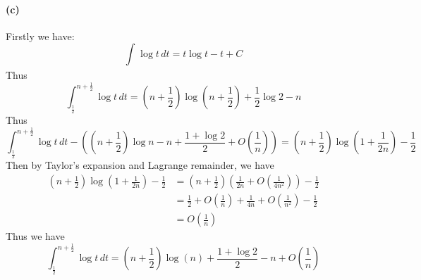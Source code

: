 \documentclass{article}
\begin{document}
\paragraph[short]{(c)}
{
Firstly we have:
$$  \int_{}^{}\log t \, dt=t\log t-t+C$$
Thus $$\int_{\frac{1}{2}}^{n+\frac{1}{2}}\log t \, dt=
\left(n+\frac{1}{2}\right)\log\left(n+\frac{1}{2}\right)+\frac{1}{2}\log2-n$$
Thus
$$\int_{\frac{1}{2}}^{n+\frac{1}{2}}\log t \, dt-\left(\left(n+\frac{1}{2}\right)\log n
-n+\frac{1+\log 2}{2}+O\left(\frac{1}{n}\right)\right)=\left(n+\frac{1}{2}\right)\log \left(1+\frac{1}{2n}\right)-\frac{1}{2}$$
Then by Taylor's expansion and Lagrange remainder, we have
\begin{align*}
    \left(n+\frac{1}{2}\right)\log \left(1+\frac{1}{2n}\right)-\frac{1}{2}&=\left(n+\frac{1}{2}\right)\left(\frac{1}{2n}+O\left(\frac{1}{4n^2}\right)\right)-\frac{1}{2}\\
    &=\frac{1}{2}+O\left(\frac{1}{n}\right)+\frac{1}{4n}+O\left(\frac{1}{n^2}\right)-\frac{1}{2}\\
    &=O\left(\frac{1}{n}\right)
\end{align*}
Thus we have
$$\int_{\frac{1}{2}}^{n+\frac{1}{2}}\log t \, dt=
\left(n+\frac{1}{2}\right)\log\left(n\right)+\frac{1+\log 2}{2}-n+O\left(\frac{1}{n}\right)$$
}
\end{document}
